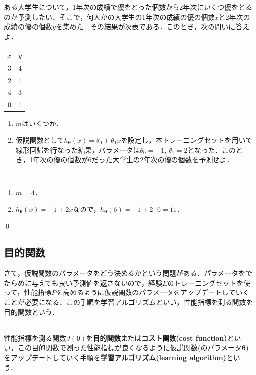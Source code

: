 \begin{qu}
ある大学生について，1年次の成績で優をとった個数から2年次にいくつ優をとるのか予測したい．そこで，何人かの大学生の1年次の成績の優の個数$x$と2年次の成績の優の個数$y$を集めた．その結果が次表である．このとき，次の問いに答えよ．
\begin{table}[H]
\centering
\begin{tabular}{rr}
\hline
$x$    & $y$   \\ \hline
3 & 4 \\
2 & 1 \\
4 & 3 \\
0  & 1 \\ \hline
\end{tabular}
\end{table}
\begin{enumerate}
\item $m$はいくつか．
\item 仮説関数として$h_{{\bm \theta}}(x)=\theta_0+\theta_1 x$を設定し，本トレーニングセットを用いて線形回帰を行なった結果，パラメータは$\theta_0=-1,~\theta_1=2$となった．このとき，1年次の優の個数が6だった大学生の2年次の優の個数を予測せよ．
\end{enumerate}
\end{qu}
\begin{ans}　
\begin{enumerate}
\item $m=4$．
\item $h_{{\bm \theta}}(x)=-1+2x$なので，$h_{{\bm \theta}}(6)=-1+2\cdot 6=11$．
\end{enumerate}
\qed	
\end{ans}

\subsection{目的関数}

さて，仮説関数のパラメータをどう決めるかという問題がある．パラメータをでたらめに与えても良い予測値を返さないので，経験$E$のトレーニングセットを使って，性能指標$P$を高めるように仮説関数のパラメータをアップデートしていくことが必要になる．この手順を学習アルゴリズムといい，性能指標を測る関数を目的関数という．

\begin{defi}
　\\
性能指標を測る関数$J({\bm \theta})$を{\bf 目的関数}または{\bf コスト関数(cost function)}といい，この目的関数で測った性能指標が良くなるように仮説関数(のパラメータ${\bm \theta}$)をアップデートしていく手順を{\bf 学習アルゴリズム(learning algorithm)}という．
\end{defi}

